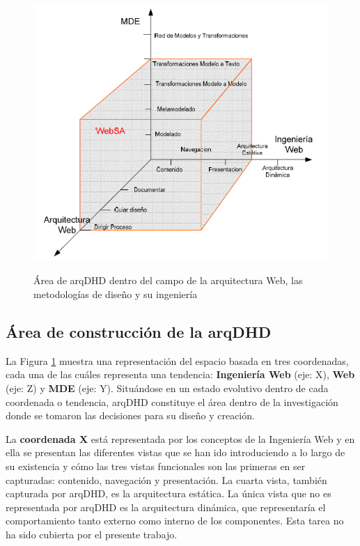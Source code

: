 \begin{figure}
 
\begin{center}
 \includegraphics[scale=0.55]{Ch2/f1}
\label{fig:planos}
\caption{Área de arqDHD dentro del campo de la arquitectura Web, las metodologías de diseño y su ingeniería} 
\end{center}

\end{figure}


\subsection{Área de construcción de la arqDHD} \label{secc:arqDHD_Situacion}


La Figura \ref{fig:planos} muestra una representación del espacio basada en
tres coordenadas, cada una de las cuáles representa una tendencia: \textbf{Ingeniería
Web} (eje: X), \textbf{Web} (eje: Z) y \textbf{MDE} (eje: Y). Situándose en un estado evolutivo dentro de cada coordenada o tendencia, arqDHD constituye el área dentro de la investigación donde se tomaron las decisiones para su diseño y creación. 

La \textbf{coordenada X} está representada por los conceptos de la Ingeniería Web y en ella se presentan las diferentes vistas que se han ido introduciendo a lo largo de su existencia y cómo las tres vistas funcionales son las primeras en
ser capturadas:
contenido, navegación y presentación. La cuarta vista, también capturada por
arqDHD, es la arquitectura estática. La única vista que no es representada por
arqDHD es la arquitectura dinámica, que representaría el comportamiento tanto
externo como interno de los componentes. Esta tarea no ha sido cubierta por el
presente trabajo.

